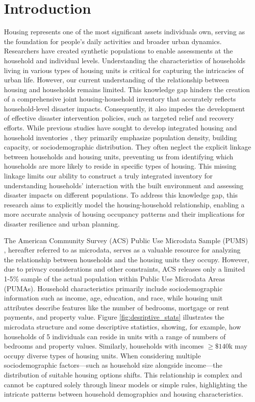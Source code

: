 \documentclass[]{nature_mod}
\begin{document}
\section{Introduction}

Housing represents one of the most significant assets individuals own, serving as the foundation for people's daily activities and broader urban dynamics. Researchers have created synthetic populations \cite{farooq2013simulation, borysov2019generate, qian2024deep, kotelnikov2023tabddpm} to enable assessments at the household and individual levels. Understanding the characteristics of households living in various types of housing units is critical for capturing the intricacies of urban life. However, our current understanding of the relationship between housing and households remains limited. This knowledge gap hinders the creation of a comprehensive joint housing-household inventory that accurately reflects household-level disaster impacts. Consequently, it also impedes the development of effective disaster intervention policies, such as targeted relief and recovery efforts.
While previous studies have sought to develop integrated housing and household inventories \cite{rosenheim2021integration, ye2024enhancing, harada2017projecting}, they primarily emphasize population density, building capacity, or sociodemographic distribution. They often neglect the explicit linkage between households and housing units, preventing us from identifying which households are more likely to reside in specific types of housing. This missing linkage limits our ability to construct a truly integrated inventory for understanding households' interaction with the built environment and assessing disaster impacts on different populations. To address this knowledge gap, this research aims to explicitly model the housing-household relationship, enabling a more accurate analysis of housing occupancy patterns and their implications for disaster resilience and urban planning.

The American Community Survey (ACS) Public Use Microdata Sample (PUMS) \cite{us_census_acs}, hereafter referred to as microdata, serves as a valuable resource for analyzing the relationship between households and the housing units they occupy. However, due to privacy considerations and other constraints, ACS releases only a limited 1-5\% sample of the actual population within Public Use Microdata Areas (PUMAs). Household characteristics primarily include sociodemographic information such as income, age, education, and race, while housing unit attributes describe features like the number of bedrooms, mortgage or rent payments, and property value. Figure \ref{fig:desriptive_stats} illustrates the microdata structure and some descriptive statistics, showing, for example, how households of 5 individuals can reside in units with a range of numbers of bedrooms and property values. Similarly, households with incomes $\geq \$140$k may occupy diverse types of housing units. When considering multiple sociodemographic factors—such as household size alongside income—the distribution of suitable housing options shifts. This relationship is complex and cannot be captured solely through linear models or simple rules, highlighting the intricate patterns between household demographics and housing characteristics.
\end{document}
